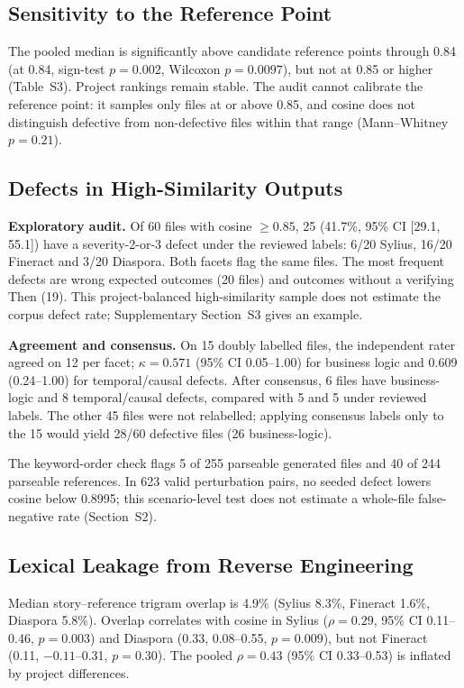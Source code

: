 \subsection{Sensitivity to the Reference Point}
\label{sec:res-b3}

The pooled median is significantly above candidate reference points through 0.84 (at 0.84, sign-test $p=0.002$, Wilcoxon $p=0.0097$), but not at 0.85 or higher (Table~S3). Project rankings remain stable. The audit cannot calibrate the reference point: it samples only files at or above 0.85, and cosine does not distinguish defective from non-defective files within that range (Mann--Whitney $p=0.21$).

\subsection{Defects in High-Similarity Outputs}
\label{sec:res-defects}

\textbf{Exploratory audit.} Of 60 files with cosine $\geq0.85$, 25 (41.7\%, 95\% CI [29.1, 55.1]) have a severity-2-or-3 defect under the reviewed labels: 6/20 Sylius, 16/20 Fineract and 3/20 Diaspora. Both facets flag the same files. The most frequent defects are wrong expected outcomes (20 files) and outcomes without a verifying Then (19). This project-balanced high-similarity sample does not estimate the corpus defect rate; Supplementary Section~S3 gives an example.

\textbf{Agreement and consensus.} On 15 doubly labelled files, the independent rater agreed on 12 per facet; $\kappa=0.571$ (95\% CI 0.05--1.00) for business logic and 0.609 (0.24--1.00) for temporal/causal defects. After consensus, 6 files have business-logic and 8 temporal/causal defects, compared with 5 and 5 under reviewed labels. The other 45 files were not relabelled; applying consensus labels only to the 15 would yield 28/60 defective files (26 business-logic).

The keyword-order check flags 5 of 255 parseable generated files and 40 of 244 parseable references. In 623 valid perturbation pairs, no seeded defect lowers cosine below 0.8995; this scenario-level test does not estimate a whole-file false-negative rate (Section~S2).

\subsection{Lexical Leakage from Reverse Engineering}
\label{sec:res-b1}

Median story--reference trigram overlap is 4.9\% (Sylius 8.3\%, Fineract 1.6\%, Diaspora 5.8\%). Overlap correlates with cosine in Sylius ($\rho=0.29$, 95\% CI 0.11--0.46, $p=0.003$) and Diaspora (0.33, 0.08--0.55, $p=0.009$), but not Fineract (0.11, $-0.11$--0.31, $p=0.30$). The pooled $\rho=0.43$ (95\% CI 0.33--0.53) is inflated by project differences.

